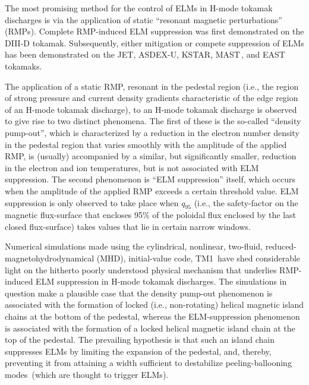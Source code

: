 \documentclass[12pt,prb,aps]{revtex4-1}
\begin{document}
The most promising method for the control of ELMs in H-mode tokamak discharges is via the application of static   ``resonant magnetic perturbations'' (RMPs). Complete RMP-induced 
ELM suppression was first demonstrated on the DIII-D tokamak.\cite{evans} Subsequently, either mitigation or compete suppression of
ELMs has been demonstrated on the JET,\cite{jet} ASDEX-U,\cite{asdex} KSTAR,\cite{kstar} MAST\,\cite{mast}, and EAST\,\cite{east} tokamaks.

The application of a static RMP, resonant in the pedestal region (i.e., the region of strong pressure and current density gradients characteristic of the edge region of an H-mode 
tokamak discharge), to an H-mode tokamak discharge is observed to give rise to  two distinct phenomena.\cite{schmitz, lanctot,paz1,d158115,paz} The first of these  is the 
so-called ``density pump-out'', which  is characterized by a reduction in the electron number density
in the pedestal region that varies smoothly with the amplitude of the applied RMP,  is (usually) accompanied by a similar, but significantly smaller, reduction
in the electron and ion temperatures, but  is not associated with ELM suppression. The second phenomenon is  ``ELM suppression'' itself, which 
 occurs when the amplitude of the applied RMP exceeds a certain threshold value. 
ELM suppression  is only observed to take place when $q_{95}$ (i.e., the safety-factor on the magnetic flux-surface that encloses 95\% of the poloidal flux enclosed by
the last closed flux-surface) takes values that lie in certain narrow windows. \cite{paz1,d158115}

Numerical simulations made using the cylindrical,  nonlinear, two-fluid, reduced-magneto\-hydro\-dynamical (MHD), initial-value code, TM1\,\cite{tm1,tm2,tm3} have shed considerable 
light on the hitherto poorly understood  physical mechanism that underlies RMP-induced ELM
suppression in H-mode tokamak discharges.\cite{hu} The simulations  in question make a plausible case  that the density  pump-out  phenomenon is associated with the formation of   
locked (i.e., non-rotating) helical magnetic
island chains at the bottom of the pedestal, whereas the ELM-suppression phenomenon is associated with the formation of a locked helical magnetic island chain at the
top of the pedestal. The prevailing hypothesis is that such an island chain suppresses ELMs by limiting the expansion of the
pedestal, and, thereby, preventing it from attaining a width sufficient to destabilize peeling-ballooning modes\,\cite{connor}  (which are thought to trigger ELMs).\cite{d3d}
\end{document}
